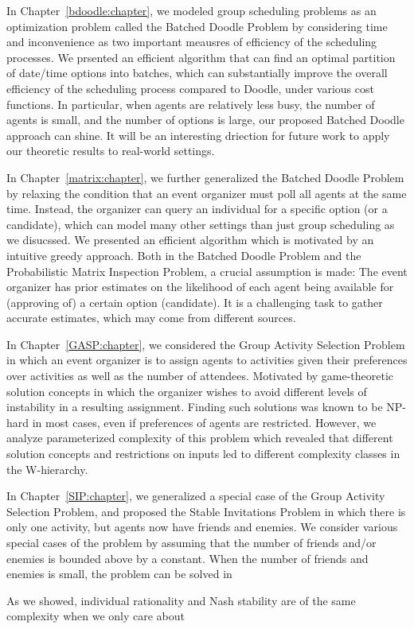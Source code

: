 \label{discussion:chapter}

In Chapter~\ref{bdoodle:chapter}, we modeled group scheduling problems as an optimization problem called the Batched Doodle Problem by considering time and inconvenience as two important meausres of efficiency of the scheduling processes. We prsented an efficient algorithm that can find an optimal partition of date/time options into batches, which can substantially improve the overall efficiency of the scheduling process compared to Doodle, under various cost functions. In particular, when agents are relatively less busy, the number of agents is small, and the number of options is large, our proposed Batched Doodle approach can shine. It will be an interesting driection for future work to apply our theoretic results to real-world settings.

In Chapter~\ref{matrix:chapter}, we further generalized the Batched Doodle Problem by relaxing the condition that an event organizer must poll all agents at the same time. Instead, the organizer can query an individual for a specific option (or a candidate), which can model many other settings than just group scheduling as we disucssed. We presented an efficient algorithm which is motivated by an intuitive greedy approach. Both in the Batched Doodle Problem and the Probabilistic Matrix Inspection Problem, a crucial assumption is made: The event organizer has prior estimates on the likelihood of each agent being available for (approving of) a certain option (candidate). It is a challenging task to gather accurate estimates, which may come from different sources. 

In Chapter~\ref{GASP:chapter}, we considered the Group Activity Selection Problem in which an event organizer is to assign agents to activities given their preferences over activities as well as the number of attendees. Motivated by game-theoretic solution concepts in which the organizer wishes to avoid different levels of instability in a resulting assignment. Finding such solutions was known to be NP-hard in most cases, even if preferences of agents are restricted. However, we analyze parameterized complexity of this problem which revealed that different solution concepts and restrictions on inputs led to different complexity classes in the W-hierarchy. 

In Chapter~\ref{SIP:chapter}, we generalized a special case of the Group Activity Selection Problem, and proposed the Stable Invitations Problem in which there is only one activity, but agents now have friends and enemies. We consider various special cases of the problem by assuming that the number of friends and/or enemies is bounded above by a constant. When the number of friends and enemies is small, the problem can be solved in 

As we showed, individual rationality and Nash stability are of the same complexity when we only care about 